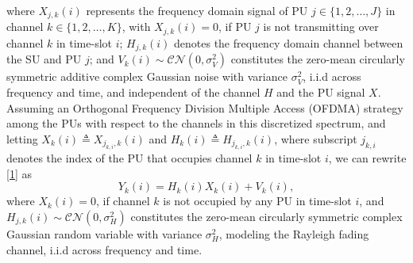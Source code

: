 \documentclass[12pt, draftcls, onecolumn]{IEEEtran}
\begin{document}
where $X_{j,k}(i)$ represents the frequency domain signal of PU $j{\in}\{1,2,\dots,J\}$ in channel $k \in \{1,2,\dots,K\}$, with $X_{j,k}(i){=}0$, if PU $j$ is not transmitting over channel $k$ in time-slot $i$; $H_{j,k}(i)$ denotes the frequency domain channel between the SU and PU $j$; and $V_{k}(i){\sim}\mathcal{CN}(0,\sigma_{V}^{2})$ constitutes the zero-mean circularly symmetric additive complex Gaussian noise with variance $\sigma_{V}^{2}$, i.i.d across frequency and time, and independent of the channel $H$ and the PU signal $X$. Assuming an Orthogonal Frequency Division Multiple Access (OFDMA) strategy among the PUs with respect to the channels in this discretized spectrum, and letting $X_{k}(i){\triangleq}X_{j_{k,i},k}(i)$ and $H_{k}(i){\triangleq}H_{j_{k,i},k}(i)$, where subscript $j_{k,i}$ denotes the index of the PU that occupies channel $k$ in time-slot $i$, we can rewrite \eqref{1} as
\begin{equation}\label{2}
    Y_{k}(i)=H_{k}(i)X_{k}(i)+V_{k}(i),
\end{equation}
where $X_{k}(i){=}0$, if channel $k$ is not occupied by any PU in time-slot $i$, and $H_{j,k}(i) \sim \mathcal{CN}(0,\sigma_{H}^{2})$ constitutes the zero-mean circularly symmetric complex Gaussian random variable with variance $\sigma_{H}^{2}$, modeling the Rayleigh fading channel, i.i.d across frequency and time.
\end{document}
